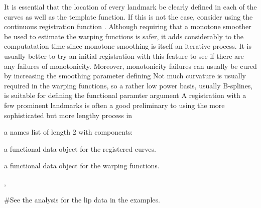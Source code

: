\begin{Details}\relax
It is essential that the location of every landmark be clearly
defined
in each of the curves as well as the template function.  If this is not
the case, consider using the continuous registration function
.
Although requiring that a monotone smoother be used to estimate the
warping functions is safer, it adds considerably to the computatation
time since monotone smoothing is itself an iterative process.  It is
usually better to try an initial registration with this feature to see
if there are any failures of monotonicity.  Moreover, monotonicity
failures can usually be cured by increasing the smoothing parameter
defining 
Not much curvature is usually required in the warping functions, so
a rather low power basis, usually B-splines, is suitable for
defining the functional paramter argument 
A registration with a few prominent landmarks is often a good
preliminary to using the more sophisticated but more lengthy process in
\end{Details}
\begin{Value}
a names list of length 2 with components:

\begin{ldescription}
\item[\code{fdreg}] a functional data object for the registered curves.

\item[\code{warpfd}] a functional data object for the warping functions.

\end{ldescription}
\end{Value}
\begin{SeeAlso}\relax
{}, 
\end{SeeAlso}
\begin{Examples}
\begin{ExampleCode}
#See the analysis for the lip data in the examples.
\end{ExampleCode}
\end{Examples}

